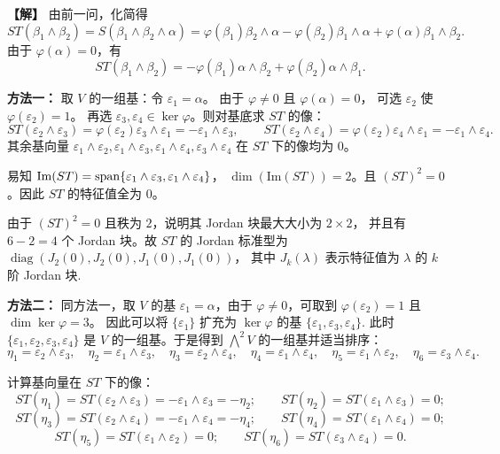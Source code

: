 \begin{enumerate}
\textbf{【解】} 由前一问，化简得
\[ST(\beta_1\wedge\beta_2)=S(\beta_1\wedge\beta_2\wedge\alpha)
=\varphi(\beta_1)\beta_2\wedge\alpha-\varphi(\beta_2)\beta_1\wedge\alpha
+\varphi(\alpha)\beta_1\wedge\beta_2.\]
由于 $\varphi(\alpha)=0$，有
\[ST(\beta_1\wedge\beta_2)=-\varphi(\beta_1)\alpha\wedge\beta_2
+\varphi(\beta_2)\alpha\wedge\beta_1.\]

\textbf{方法一：} 取 $V$ 的一组基：令 $\varepsilon_1=\alpha$。
由于 $\varphi\neq0$ 且 $\varphi(\alpha)=0$，
可选 $\varepsilon_2$ 使 $\varphi(\varepsilon_2)=1$。
再选 $\varepsilon_3,\varepsilon_4\in\ker\varphi$。则对基底求 $ST$ 的像：
\[ST(\varepsilon_2\wedge\varepsilon_3)=\varphi(\varepsilon_2)\varepsilon_3\wedge\varepsilon_1=-\varepsilon_1\wedge\varepsilon_3,
\qquad
ST(\varepsilon_2\wedge\varepsilon_4)=\varphi(\varepsilon_2)\varepsilon_4\wedge\varepsilon_1=-\varepsilon_1\wedge\varepsilon_4.\]
其余基向量 $\varepsilon_1\wedge\varepsilon_2,\varepsilon_1\wedge\varepsilon_3,\varepsilon_1\wedge\varepsilon_4,\varepsilon_3\wedge\varepsilon_4$ 在 $ST$ 下的像均为 $0$。

易知 $\mathrm{Im}(ST)=\operatorname{span}\{\varepsilon_1\wedge\varepsilon_3,\varepsilon_1\wedge\varepsilon_4\}$，
$\dim(\mathrm{Im}(ST))=2$。且 $(ST)^2=0$。因此 $ST$ 的特征值全为 $0$。

由于 $(ST)^2=0$ 且秩为 $2$，说明其 Jordan 块最大大小为 $2\times2$，
并且有 $6-2=4$ 个 Jordan 块。故 $ST$ 的 Jordan 标准型为 $\operatorname{diag}(J_2(0),J_2(0),J_1(0),J_1(0))$，
其中 $J_k(\lambda)$ 表示特征值为 $\lambda$ 的 $k$ 阶 Jordan 块.

\textbf{方法二：} 同方法一，取 $V$ 的基 $\varepsilon_1=\alpha$，由于 $\varphi\neq0$，可取到 $\varphi(\varepsilon_2)=1$ 且 $\dim\ker\varphi=3$。
因此可以将 $\{\varepsilon_1\}$ 扩充为 $\ker\varphi$ 的基 $\{\varepsilon_1,\varepsilon_3,\varepsilon_4\}$. 
此时 $\{\varepsilon_1,\varepsilon_2,\varepsilon_3,\varepsilon_4\}$ 是 $V$ 的一组基。于是得到 $\bigwedge^2V$ 的一组基并适当排序：
\[\eta_1=\varepsilon_2\wedge\varepsilon_3,\quad
\eta_2=\varepsilon_1\wedge\varepsilon_3,\quad
\eta_3=\varepsilon_2\wedge\varepsilon_4,\quad
\eta_4=\varepsilon_1\wedge\varepsilon_4,\quad
\eta_5=\varepsilon_1\wedge\varepsilon_2,\quad
\eta_6=\varepsilon_3\wedge\varepsilon_4.\]

计算基向量在 $ST$ 下的像：
\[ST(\eta_1)=ST(\varepsilon_2\wedge\varepsilon_3)=-\varepsilon_1\wedge\varepsilon_3=-\eta_2;\qquad
ST(\eta_2)=ST(\varepsilon_1\wedge\varepsilon_3)=0;\]
\[ST(\eta_3)=ST(\varepsilon_2\wedge\varepsilon_4)=-\varepsilon_1\wedge\varepsilon_4=-\eta_4;\qquad
ST(\eta_4)=ST(\varepsilon_1\wedge\varepsilon_4)=0;\]
\[ST(\eta_5)=ST(\varepsilon_1\wedge\varepsilon_2)=0;\qquad
ST(\eta_6)=ST(\varepsilon_3\wedge\varepsilon_4)=0.\]


\end{enumerate}

